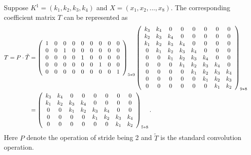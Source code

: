 Suppose $K^1=(k_1, k_2, k_3, k_4)$ and $X=(x_1, x_2, ..., x_8)$. The corresponding coefficient matrix $T$ can be represented as 
\begin{align}
   T = P \cdot \tilde{T} &= 
\left(
  \begin{array}{ccccccccc}
     1 & 0 & 0 & 0 & 0 & 0 & 0 & 0 & 0 \\
     0 & 0 & 1 & 0 & 0 & 0 & 0 & 0 & 0 \\
     0 & 0 & 0 & 0 & 1 & 0 & 0 & 0 & 0 \\
     0 & 0 & 0 & 0 & 0 & 0 & 1 & 0 & 0 \\
     0 & 0 & 0 & 0 & 0 & 0 & 0 & 0 & 1 \\
  \end{array}
\right)_{5*9}
\left(
  \begin{array}{cccccccc}
     k_3 & k_4 & 0 & 0 & 0 & 0 & 0 & 0  \\
     k_2 & k_3 & k_4 & 0 & 0 & 0 & 0 &  0 \\
     k_1 & k_2 & k_3 & k_4 & 0 & 0 & 0 & 0  \\
     0 & k_1 & k_2 & k_3 & k_4 & 0 & 0 & 0  \\
     0 & 0 & k_1 & k_2 & k_3 & k_4 & 0 & 0  \\
     0 & 0 & 0 & k_1 & k_2 & k_3 & k_4 & 0  \\
     0 & 0 & 0 & 0 & k_1 & k_2 & k_3 & k_4  \\
     0 & 0 & 0 & 0 & 0 & k_1 & k_2 & k_3   \\
     0 & 0 & 0 & 0 & 0 & 0 & k_1 & k_2  \\
  \end{array}
\right)_{9*8}\\ \notag 
&= 
\left(
  \begin{array}{cccccccc}
     k_3 & k_4 & 0 & 0 & 0 & 0 & 0 & 0  \\
     k_1 & k_2 & k_3 & k_4 & 0 & 0 & 0 &  0 \\
     0 & 0 & k_1 & k_2 & k_3 & k_4 & 0 &  0  \\
     0 & 0 & 0 &0 & k_1 & k_2 & k_3 & k_4   \\
     0 & 0 & 0 & 0 & 0 & 0 & k_1 & k_2    \\
  \end{array}
\right)_{5*8}.
\end{align}
Here $P$ denote the operation of stride being 2 and $\tilde{T}$ is the standard convolution operation.

